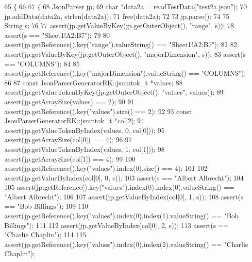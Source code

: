 \begin{DoxyCode}
65                                  \{
66 
67     \{
68         JsonParser jp;
69         \textcolor{keywordtype}{char} *data2a = readTestData(\textcolor{stringliteral}{"test2a.json"});
70         jp.addData(data2a, strlen(data2a));
71         free(data2a);
72 
73         jp.parse();
74 
75         String s;
76 
77         assert(jp.getValueByKey(jp.getOuterObject(), \textcolor{stringliteral}{"range"}, s));
78         assert(s == \textcolor{stringliteral}{"Sheet1!A2:B7"});
79 
80         assert(jp.getReference().key(\textcolor{stringliteral}{"range"}).valueString() == \textcolor{stringliteral}{"Sheet1!A2:B7"});
81 
82         assert(jp.getValueByKey(jp.getOuterObject(), \textcolor{stringliteral}{"majorDimension"}, s));
83         assert(s == \textcolor{stringliteral}{"COLUMNS"});
84 
85         assert(jp.getReference().key(\textcolor{stringliteral}{"majorDimension"}).valueString() == \textcolor{stringliteral}{"COLUMNS"});
86 
87         \textcolor{keyword}{const} JsonParserGeneratorRK::jsmntok_t *values;
88         assert(jp.getValueTokenByKey(jp.getOuterObject(), \textcolor{stringliteral}{"values"}, values));
89         assert(jp.getArraySize(values) == 2);
90 
91         assert(jp.getReference().key(\textcolor{stringliteral}{"values"}).size() == 2);
92 
93         \textcolor{keyword}{const} JsonParserGeneratorRK::jsmntok_t *col[2];
94         assert(jp.getValueTokenByIndex(values, 0, col[0]));
95         assert(jp.getArraySize(col[0]) == 4);
96 
97         assert(jp.getValueTokenByIndex(values, 1, col[1]));
98         assert(jp.getArraySize(col[1]) == 4);
99 
100         assert(jp.getReference().key(\textcolor{stringliteral}{"values"}).index(0).size() == 4);
101 
102         assert(jp.getValueByIndex(col[0], 0, s));
103         assert(s == \textcolor{stringliteral}{"Albert Albrecht"});
104 
105         assert(jp.getReference().key(\textcolor{stringliteral}{"values"}).index(0).index(0).valueString() == \textcolor{stringliteral}{"Albert Albrecht"});
106 
107         assert(jp.getValueByIndex(col[0], 1, s));
108         assert(s == \textcolor{stringliteral}{"Bob Billings"});
109 
110         assert(jp.getReference().key(\textcolor{stringliteral}{"values"}).index(0).index(1).valueString() == \textcolor{stringliteral}{"Bob Billings"});
111 
112         assert(jp.getValueByIndex(col[0], 2, s));
113         assert(s == \textcolor{stringliteral}{"Charlie Chaplin"});
114 
115         assert(jp.getReference().key(\textcolor{stringliteral}{"values"}).index(0).index(2).valueString() == \textcolor{stringliteral}{"Charlie Chaplin"});

\end{DoxyCode}
